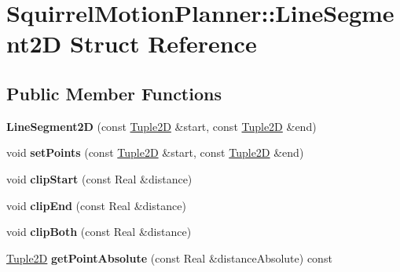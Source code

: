 \hypertarget{structSquirrelMotionPlanner_1_1LineSegment2D}{\section{Squirrel\-Motion\-Planner\-:\-:Line\-Segment2\-D Struct Reference}
\label{structSquirrelMotionPlanner_1_1LineSegment2D}
}
\subsection*{Public Member Functions}
\begin{DoxyCompactItemize}
\item 
\hypertarget{structSquirrelMotionPlanner_1_1LineSegment2D_a273e8fe6214e2b8c0d014e5316d2329c}{{\bfseries Line\-Segment2\-D} (const \hyperlink{structSquirrelMotionPlanner_1_1Tuple2D}{Tuple2\-D} \&start, const \hyperlink{structSquirrelMotionPlanner_1_1Tuple2D}{Tuple2\-D} \&end)}\label{structSquirrelMotionPlanner_1_1LineSegment2D_a273e8fe6214e2b8c0d014e5316d2329c}

\item 
\hypertarget{structSquirrelMotionPlanner_1_1LineSegment2D_a1a387b77df6c4822f920ea8f3166b9f3}{void {\bfseries set\-Points} (const \hyperlink{structSquirrelMotionPlanner_1_1Tuple2D}{Tuple2\-D} \&start, const \hyperlink{structSquirrelMotionPlanner_1_1Tuple2D}{Tuple2\-D} \&end)}\label{structSquirrelMotionPlanner_1_1LineSegment2D_a1a387b77df6c4822f920ea8f3166b9f3}

\item 
\hypertarget{structSquirrelMotionPlanner_1_1LineSegment2D_ae33f15e53da513f4c9c59f0e6225e0fc}{void {\bfseries clip\-Start} (const Real \&distance)}\label{structSquirrelMotionPlanner_1_1LineSegment2D_ae33f15e53da513f4c9c59f0e6225e0fc}

\item 
\hypertarget{structSquirrelMotionPlanner_1_1LineSegment2D_a83e2b05c8f406731f796dc54a4cce863}{void {\bfseries clip\-End} (const Real \&distance)}\label{structSquirrelMotionPlanner_1_1LineSegment2D_a83e2b05c8f406731f796dc54a4cce863}

\item 
\hypertarget{structSquirrelMotionPlanner_1_1LineSegment2D_abb1b205ce81ac55e9a769be55efaec2a}{void {\bfseries clip\-Both} (const Real \&distance)}\label{structSquirrelMotionPlanner_1_1LineSegment2D_abb1b205ce81ac55e9a769be55efaec2a}

\item 
\hypertarget{structSquirrelMotionPlanner_1_1LineSegment2D_a2bea239489856c3cd0f00bf28c5b0925}{\hyperlink{structSquirrelMotionPlanner_1_1Tuple2D}{Tuple2\-D} {\bfseries get\-Point\-Absolute} (const Real \&distance\-Absolute) const }\label{structSquirrelMotionPlanner_1_1LineSegment2D_a2bea239489856c3cd0f00bf28c5b0925}


\end{DoxyCompactItemize}
